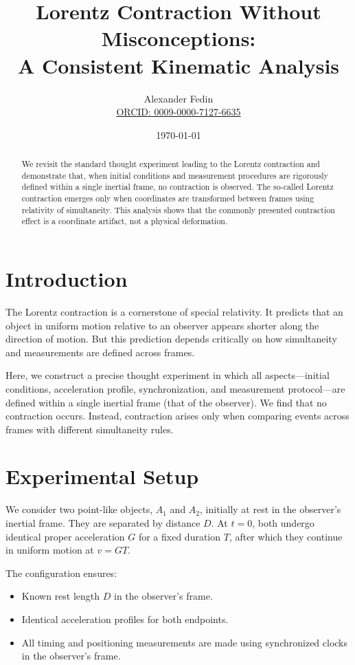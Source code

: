 \documentclass[11pt]{article}
\title{\textbf{Lorentz Contraction Without Misconceptions:\\A Consistent Kinematic Analysis}}
\author{Alexander Fedin\\\href{https://orcid.org/0009-0000-7127-6635}{ORCID: 0009-0000-7127-6635}}
\date{\today}
\begin{document}
\maketitle

\begin{abstract}
We revisit the standard thought experiment leading to the Lorentz contraction and demonstrate that, when initial conditions and measurement procedures are rigorously defined within a single inertial frame, no contraction is observed. The so-called Lorentz contraction emerges only when coordinates are transformed between frames using relativity of simultaneity. This analysis shows that the commonly presented contraction effect is a coordinate artifact, not a physical deformation.
\end{abstract}

\section{Introduction}

The Lorentz contraction is a cornerstone of special relativity. It predicts that an object in uniform motion relative to an observer appears shorter along the direction of motion. But this prediction depends critically on how simultaneity and measurements are defined across frames.

Here, we construct a precise thought experiment in which all aspects—initial conditions, acceleration profile, synchronization, and measurement protocol—are defined within a single inertial frame (that of the observer). We find that no contraction occurs. Instead, contraction arises only when comparing events across frames with different simultaneity rules.

\section{Experimental Setup}

We consider two point-like objects, $A_1$ and $A_2$, initially at rest in the observer’s inertial frame. They are separated by distance $D$. At $t = 0$, both undergo identical proper acceleration $G$ for a fixed duration $T$, after which they continue in uniform motion at $v = GT$.

The configuration ensures:

\begin{itemize}
    \item Known rest length $D$ in the observer’s frame.
    \item Identical acceleration profiles for both endpoints.
    \item All timing and positioning measurements are made using synchronized clocks in the observer’s frame.
\end{itemize}
\end{document}
